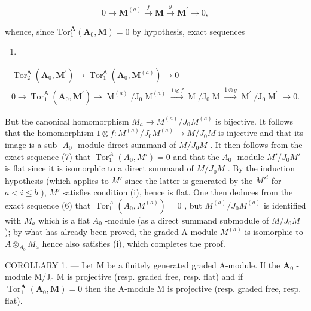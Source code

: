 \[
0 \to \mathbf {M} ^ {(a)} \xrightarrow {f} \mathbf {M} \xrightarrow {g} \mathbf {M} ^ {\prime} \to 0,
\]

whence, since \(\mathrm{Tor}_{1}^{\mathbf{A}}(\mathbf{A}_{0},\mathbf{M}) = 0\) by hypothesis, exact sequences

\begin{enumerate}
\def\labelenumi{(\arabic{enumi})}
\setcounter{enumi}{5}
\tightlist
\item
\end{enumerate}

\[
\begin{array}{c} \operatorname{Tor} _ {2} ^ {\mathsf {A}} (\mathbf {A} _ {0}, \mathbf {M} ^ {\prime}) \to \operatorname{Tor} _ {1} ^ {\mathsf {A}} (\mathbf {A} _ {0}, \mathbf {M} ^ {(a)}) \to 0 \\ 0 \to \operatorname{Tor} _ {1} ^ {\mathsf {A}} (\mathbf {A} _ {0}, \mathbf {M} ^ {\prime}) \to \operatorname{M} ^ {(a)} / \mathrm{J} _ {0} \operatorname{M} ^ {(a)} \xrightarrow {1 \otimes f} \operatorname{M} / \mathrm{J} _ {0} \operatorname{M} \xrightarrow {1 \otimes g} \operatorname{M} ^ {\prime} / \mathrm{J} _ {0} \operatorname{M} ^ {\prime} \to 0. \end{array}\tag{7}
\]

But the canonical homomorphism \(M_{a} \to M^{(a)}/J_{0} M^{(a)}\) is bijective. It follows that the homomorphism \(1 \otimes f : M^{(a)}/J_{0} M^{(a)} \to M/J_{0} M\) is injective and that its image is a sub- \(A_{0}\) -module direct summand of \(M/J_{0} M\) . It then follows from the exact sequence (7) that \(\operatorname{Tor}_{1}^{A}(A_{0}, M') = 0\) and that the \(A_{0}\) -module \(M'/J_{0} M'\) is flat since it is isomorphic to a direct summand of \(M/J_{0} M\) . By the induction hypothesis (which applies to \(M'\) since the latter is generated by the \(M'^{i}\) for \(a < i \leqslant b\) ), \(M'\) satisfies condition (i), hence is flat. One then deduces from the exact sequence (6) that \(\operatorname{Tor}_{1}^{A}(A_{0}, M^{(a)}) = 0\) , but \(M^{(a)}/J_{0} M^{(a)}\) is identified with \(M_{a}\) which is a flat \(A_{0}\) -module (as a direct summand submodule of \(M/J_{0} M\) ); by what has already been proved, the graded A-module \(M^{(a)}\) is isomorphic to \(A \otimes_{A_{0}} M_{a}\) hence also satisfies (i), which completes the proof.

COROLLARY 1. --- Let M be a finitely generated graded A-module. If the \(\mathbf{A}_0\) -module \(\mathrm{M} / \mathrm{J}_0\) M is projective (resp. graded free, resp. flat) and if \(\operatorname{Tor}_1^{\mathbf{A}}(\mathbf{A}_0, \mathbf{M}) = 0\) then the A-module M is projective (resp. graded free, resp. flat).

